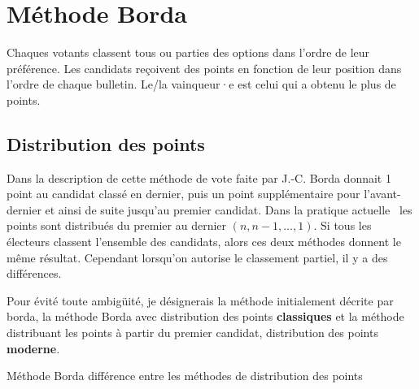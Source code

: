 \documentclass[../report]{subfiles}
\begin{document}
  \section{Méthode Borda}\label{sec:scrutin:borda}
  
  Chaques votants classent tous ou parties des options dans l'ordre de leur préférence.
  Les candidats reçoivent des points en fonction de leur position dans l'ordre de chaque bulletin.
  Le/la vainqueur·e est celui qui a obtenu le plus de points.

  \subsection{Distribution des points}

  Dans la description de cette méthode de vote faite par J.-C. Borda donnait 1 point au
  candidat classé en dernier, puis un point supplémentaire pour l'avant-dernier et ainsi
  de suite jusqu'au premier candidat.
  Dans la pratique actuelle~\cite{emerson_original_2013} les points sont distribués du 
  premier au dernier $(n, n-1, …, 1)$.
  Si tous les électeurs classent l'ensemble des candidats, alors ces deux méthodes donnent le même 
  résultat. Cependant lorsqu'on autorise le classement partiel, il y a des différences.

  Pour évité toute ambigüité, je désignerais la méthode initialement décrite par borda, 
  la méthode Borda avec distribution des points \textbf{classiques} et la méthode distribuant
  les points à partir du premier candidat, distribution des points \textbf{moderne}.

  \begin{table}
    \begin{center}
      \caption{Méthode Borda différence entre les méthodes de distribution des points}%
      \label{fig:diff:borda:caslim2}
    \end{center}
  \end{table}
\end{document}
